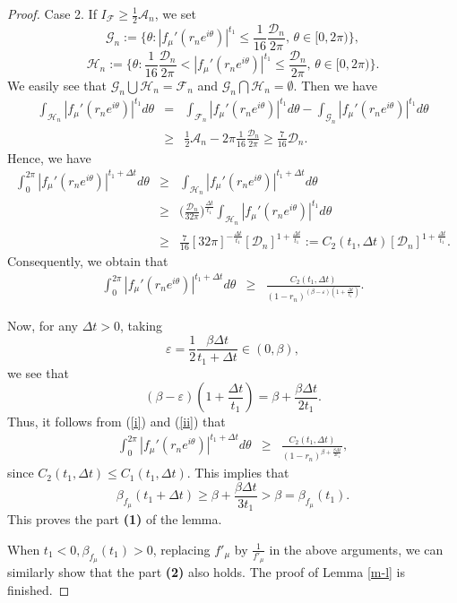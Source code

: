 \documentclass[10pt,a4paper]{amsart}
\begin{document}
\begin{proof}
Case 2. If $I_{\mathcal{F}} \geq \frac{1}{2}\mathcal{A}_n$, we set 
$$\mathcal{G}_n:=\{\theta:  |f_{\mu}'(r_ne^{i\theta})|^{t_1}\leq \frac{1}{16}\frac{\mathcal{D}_n}{2\pi},\, \theta\in [0, 2\pi)\},$$
$${\mathcal{H}_n}:=\{\theta:  \frac{1}{16}\frac{\mathcal{D}_n}{2\pi}<|f_{\mu}'(r_ne^{i\theta})|^{t_1}\leq \frac{\mathcal{D}_n}{2\pi},\,  \theta\in [0, 2\pi)\}.$$
We easily see that $\mathcal{G}_n \bigcup \mathcal{H}_n=\mathcal{F}_n$ and $\mathcal{G}_n \bigcap \mathcal{H}_n=\emptyset.$ Then we have
\begin{eqnarray}
\int_{\mathcal{H}_n}|f_{\mu}'(r_ne^{i\theta})|^{t_1} d\theta&=&\int_{\mathcal{F}_n}|f_{\mu}'(r_ne^{i\theta})|^{t_1} d\theta-\int_{\mathcal{G}_n}|f_{\mu}'(r_ne^{i\theta})|^{t_1} d\theta \nonumber \\
&\geq & \frac{1}{2}\mathcal{A}_n- 2\pi \frac{1}{16}\frac{\mathcal{D}_n}{2\pi}\geq  \frac{7}{16}\mathcal{D}_n. \nonumber
\end{eqnarray}
Hence, we have 
\begin{eqnarray}
\int_{0}^{2\pi}|f_{\mu}'(r_ne^{i\theta})|^{t_1+\Delta t} d\theta &\geq &\int_{\mathcal{H}_n}|f_{\mu}'(r_ne^{i\theta})|^{t_1+\Delta t} d\theta \nonumber \\
&\geq & \Big(\frac{\mathcal{D}_n}{32\pi}\Big)^{\frac{\Delta t}{t_1}}\int_{\mathcal{H}_n}|f_{\mu}'(r_ne^{i\theta})|^{t_1} d\theta \nonumber \\
&\geq & \frac{7}{16}[32\pi]^{-\frac{\Delta t}{t_1}}[\mathcal{D}_n]^{1+\frac{\Delta t}{t_1}}:=C_2(t_1, \Delta t)[\mathcal{D}_n]^{1+\frac{\Delta t}{t_1}}. \nonumber
\end{eqnarray}
Consequently, we obtain that 
\begin{eqnarray}\label{ii}
\int_{0}^{2\pi}|f_{\mu}'(r_ne^{i\theta})|^{t_1+\Delta t} d\theta&\geq  & \frac{ C_2(t_1, \Delta t)}{(1-r_n)^{(\beta-\varepsilon)(1+\frac{\Delta t}{t_1})}}. 
\end{eqnarray}

Now, for any $\Delta t>0$, taking $$\varepsilon=\frac{1}{2}\frac{\beta \Delta t}{t_1+\Delta t}\in (0, \beta),$$ we see that 
$$(\beta-\varepsilon)(1+\frac{\Delta t}{t_1})=\beta+\frac{\beta\Delta t}{2t_1}.$$
Thus, it follows from (\ref{i}) and (\ref{ii}) that 
\begin{eqnarray}\label{iii}
\int_{0}^{2\pi}|f_{\mu}'(r_ne^{i\theta})|^{t_1+\Delta t} d\theta&\geq  & \frac{ C_2(t_1, \Delta t)}{(1-r_n)^{\beta+\frac{\beta \Delta t}{2t_1}}}, \nonumber 
\end{eqnarray}
since $C_2(t_1, \Delta t)\leq C_1(t_1, \Delta t).$ This implies that 
$$\beta_{f_{\mu}}(t_1+\Delta t)\geq \beta+\frac{\beta \Delta t}{3t_1}>\beta=\beta_{f_{\mu}}(t_1).$$
This proves the part {\bf(1)} of the lemma.  

When $t_1<0, \beta_{f_{\mu}}(t_1)>0$, replacing $f'_{\mu}$ by $\frac{1}{f'_{\mu}}$ in the above arguments, we can similarly show that the part {\bf (2)} also holds.  The proof of Lemma \ref{m-l} is finished. 
\end{proof}
\end{document}
